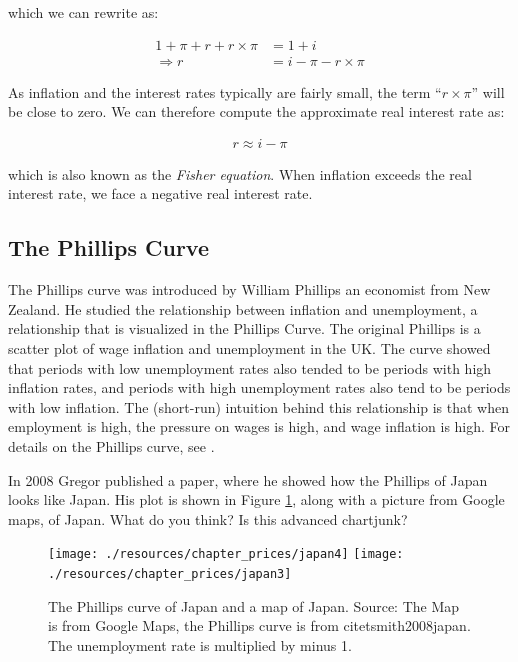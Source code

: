 \documentclass[
]{book}
\begin{document}
which we can rewrite as:

\begin{align}
    1+\pi+r+r\times \pi&= 1+i\nonumber\\
 \Rightarrow    r&= i-\pi-r\times \pi
\end{align}

As inflation and the interest rates typically are fairly small, the term ``\(r\times \pi\)'' will be close to zero. We can therefore compute the approximate real interest rate as:

\begin{align}
    r\approx i-\pi
\end{align}

which is also known as the \emph{Fisher equation}. When inflation exceeds the real interest rate, we face a negative real interest rate.

\hypertarget{the-phillips-curve}{%
\subsection*{The Phillips Curve}\label{the-phillips-curve}}

The Phillips curve was introduced by William Phillips an economist from New Zealand. He studied the relationship between inflation and unemployment, a relationship that is visualized in the Phillips Curve. The original Phillips is a scatter plot of wage inflation and unemployment in the UK. The curve showed that periods with low unemployment rates also tended to be periods with high inflation rates, and periods with high unemployment rates also tend to be periods with low inflation. The (short-run) intuition behind this relationship is that when employment is high, the pressure on wages is high, and wage inflation is high. For details on the Phillips curve, see \citep[p.~646 in][]{core} .

In 2008 Gregor \citep{smith2008japan} published a paper, where he showed how the Phillips of Japan looks like Japan. His plot is shown in Figure \ref{fig:pricejapan}, along with a picture from Google maps, of Japan. What do you think? Is this advanced chartjunk?

\begin{figure}

{\centering \texttt{[image: ./resources/chapter\_prices/japan4]} \texttt{[image: ./resources/chapter\_prices/japan3]} 

}

\caption{The Phillips curve of Japan and a map of Japan. Source: The Map is from Google Maps, the Phillips curve is from citet{smith2008japan}. The unemployment rate is multiplied by minus 1. }\label{fig:pricejapan}
\end{figure}
\end{document}

